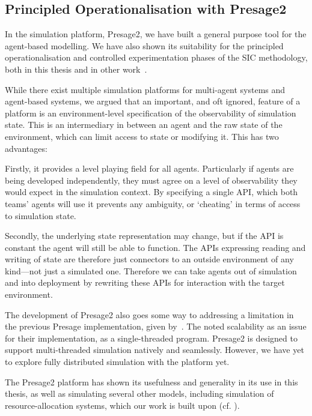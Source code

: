 \subsection{Principled Operationalisation with Presage2}

In the simulation platform, Presage2, we have built a general purpose tool for
the agent-based modelling. We have also shown its suitability for the
principled operationalisation and controlled experimentation phases of the
\ac{SIC} methodology, both in this thesis and in other
work~\citep{Macbeth2014}.

While there exist multiple simulation platforms for multi-agent systems and
agent-based systems, we argued that an important, and oft ignored, feature of
a platform is an environment-level specification of the observability of
simulation state. This is an intermediary in between an agent and the raw
state of the environment, which can limit access to state or modifying it.
This has two advantages:

Firstly, it provides a level playing field for all agents. Particularly if
agents are being developed independently, they must agree on a level of
observability they would expect in the simulation context. By specifying a
single \ac{API}, which both teams' agents will use it prevents any ambiguity,
or `cheating' in terms of access to simulation state.

Secondly, the underlying state representation may change, but if the \ac{API}
is constant the agent will still be able to function. The \acp{API} expressing
reading and writing of state are therefore just connectors to an outside
environment of any kind---not just a simulated one. Therefore we can take
agents out of simulation and into deployment by rewriting these \acp{API} for
interaction with the target environment.

The development of Presage2 also goes some way to addressing a limitation in
the previous Presage implementation, given by~\citet{Neville2011}. The noted
scalability as an issue for their implementation, as a single-threaded
program. Presage2 is designed to support multi-threaded simulation natively
and seamlessly. However, we have yet to explore fully distributed simulation
with the platform yet.

The Presage2 platform has shown its usefulness and generality in its use in
this thesis, as well as simulating several other models, including simulation
of resource-allocation systems, which our work is built upon (cf.
\citet{Schaumeier2013,Pitt2014}).

